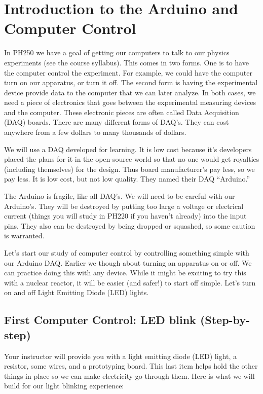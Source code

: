 \chapter{Introduction to the Arduino and Computer Control}
In PH250 we have a goal of getting our computers to talk to our physics
experiments (see the course syllabus). This comes in two forms. One is to
have the computer control the experiment. For example, we could have the
computer turn on our apparatus, or turn it off. The second form is having
the experimental device provide data to the computer that we can later
analyze. In both cases, we need a piece of electronics that goes between the
experimental measuring devices and the computer. These electronic pieces are
often called Data Acquisition (DAQ) boards. There are many different forms
of DAQ's. They can cost anywhere from a few dollars to many thousands of
dollars.

We will use a DAQ developed for learning. It is low cost because it's
developers placed the plans for it in the open-source world so that no one
would get royalties (including themselves) for the design. Thus board
manufacturer's pay less, so we pay less. It is low cost, but not low
quality. They named their DAQ \textquotedblleft Arduino.\textquotedblright\ 

The Arduino is fragile, like all DAQ's. We will need to be careful with our
Arduino's. They will be destroyed by putting too large a voltage or electrical current (things you will study in PH220 if you haven't already) into the input pins. They also can be destroyed by being dropped or squashed, so some caution is warranted.

Let's start our study of computer control by controlling something simple
with our Arduino DAQ. Earlier we though about turning an apparatus on or
off. We can practice doing this with any device. While it might be exciting
to try this with a nuclear reactor, it will be easier (and safer!) to start
off simple. Let's turn on and off Light Emitting Diode (LED) lights.

\section{First Computer Control: LED blink (Step-by-step)}

Your instructor will provide you with a light emitting diode (LED) light, a
resistor, some wires, and a prototyping board. This last item helps hold the
other things in place so we can make electricity go through them. Here is
what we will build for our light blinking experience:


